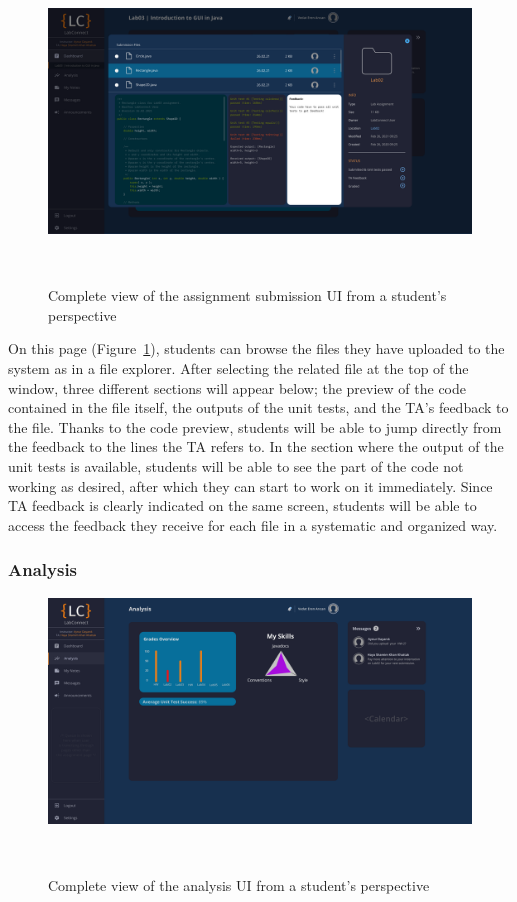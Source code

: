 \documentclass[a4paper, 12pt]{article}
\begin{document}
    \begin{figure}[H]
        \centering
        \includegraphics[width=\textwidth]{student_assignment_submission}
        \caption{Complete view of the assignment submission UI from a student's perspective}~\label{fig:student_assignment_submission_full}
    \end{figure}

    On this page (Figure~\ref{fig:student_assignment_submission_full}), students can browse the files they have uploaded to the system as in a file explorer.
    After selecting the related file at the top of the window, three different sections will appear below; the preview of the code contained in the file itself, 
    the outputs of the unit tests, and the TA's feedback to the file. Thanks to the code preview, students will be able to jump directly from the feedback 
    to the lines the TA refers to. In the section where the output of the unit tests is available, students will be able to see the part of the code not 
    working as desired, after which they can start to work on it immediately. Since TA feedback is clearly indicated on the same screen, students will be able to access the feedback they 
    receive for each file in a systematic and organized way.

    \pagebreak
    
    \subsubsection{Analysis}
    
    \begin{figure}[H]
        \centering
        \includegraphics[width=\textwidth]{student_analysis}
        \caption{Complete view of the analysis UI from a student's perspective}~\label{fig:student_analysis_full}
    \end{figure}
    
\end{document}

